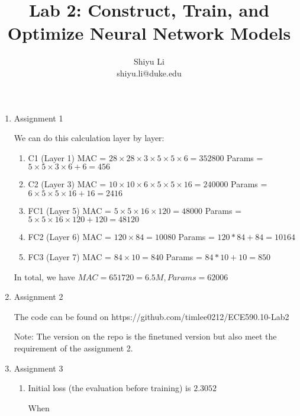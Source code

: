\documentclass[11pt]{article}
\begin{document}
\author{Shiyu Li \\ shiyu.li@duke.edu}
\title{Lab 2: Construct, Train, and Optimize Neural Network Models}
\maketitle

\medskip

\begin{enumerate}

\item
Assignment 1

We can do this calculation layer by layer:

\begin{enumerate}
    \item C1 (Layer 1)
        MAC = $28\times 28 \times 3 \times 5 \times 5 \times 6 = 352800$ 
        Params = $5\times 5\times 3 \times 6 + 6  = 456$
    \item C2 (Layer 3)
        MAC = $10\times 10 \times 6 \times 5 \times 5 \times 16 = 240000$
        Params = $6\times 5 \times 5 \times 16 + 16 = 2416$
    \item FC1 (Layer 5)
        MAC = $5\times 5\times 16 \times 120 = 48000$
        Params = $5\times 5\times 16 \times 120 + 120 = 48120$
        
    \item FC2 (Layer 6)
        MAC = $120 \times 84 = 10080$
        Params = $120*84 + 84 = 10164$
        
    \item FC3 (Layer 7)
        MAC = $84 \times 10 = 840$
        Params = $84 * 10 + 10 = 850$
        
\end{enumerate}

In total, we have $MAC = 651720 = 6.5M, Params= 62006$

\item
Assignment 2

The code can be found on https://github.com/timlee0212/ECE590.10-Lab2

Note: The version on the repo is the finetuned version but also meet the requirement of the assignment 2.

\item
Assignment 3

\begin{enumerate}
    \item Initial loss (the evaluation before training) is $2.3052$
    
    When
\end{enumerate}

\end{enumerate}
\end{document}
